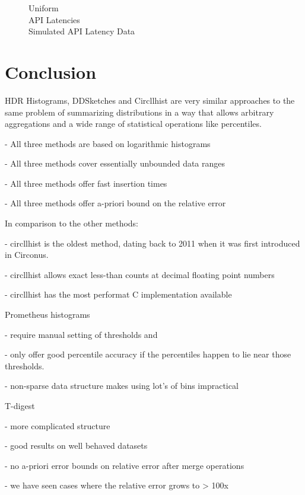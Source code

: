 \documentclass{article}
\theoremstyle{plain}
\theoremstyle{remark}
\begin{document}
{\begin{figure}
  Uniform\\
  
  API Latencies\\
  
  Simulated API Latency Data\\
  
\end{figure}

\section{Conclusion}

HDR Histograms, DDSketches and Circllhist are very similar approaches to the same problem of
summarizing distributions in a way that allows arbitrary aggregations and a wide range of
statistical operations like percentiles.

- All three methods are based on logarithmic histograms

- All three methods cover essentially unbounded data ranges

- All three methods offer fast insertion times

- All three methods offer a-priori bound on the relative error

In comparison to the other methods:

- circllhist is the oldest method, dating back to 2011 when it was first introduced in Circonus.

- circllhist allows exact less-than counts at decimal floating point numbers

- circllhist has the most performat C implementation available

Prometheus histograms

- require manual setting of thresholds and

- only offer good percentile accuracy if the percentiles happen to lie near those thresholds.

- non-sparse data structure makes using lot's of bins impractical

T-digest

- more complicated structure

- good results on well behaved datasets

- no a-priori error bounds on relative error after merge operations

- we have seen cases where the relative error grows to > 100x


}
\end{document}

